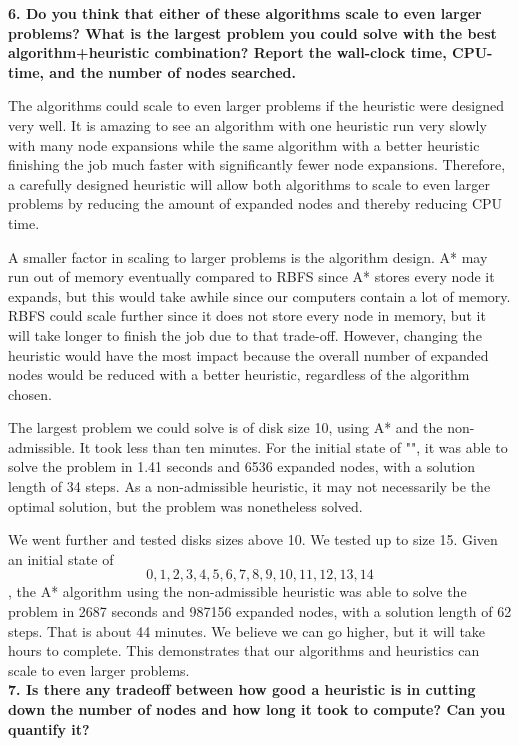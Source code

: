 \textbf{6. Do you think that either of these algorithms scale to even larger problems? What is the largest problem you could solve with the best algorithm+heuristic combination? Report the wall-clock time, CPU-time, and the number of nodes searched.}

The algorithms could scale to even larger problems if the heuristic were designed very well. It is amazing to see an algorithm with one heuristic run very slowly with many node expansions while the same algorithm with a better heuristic finishing the job much faster with significantly fewer node expansions. Therefore, a carefully designed heuristic will allow both algorithms to scale to even larger problems by reducing the amount of expanded nodes and thereby reducing CPU time.

A smaller factor in scaling to larger problems is the algorithm design. A* may run out of memory eventually compared to RBFS since A* stores every node it expands, but this would take awhile since our computers contain a lot of memory. RBFS could scale further since it does not store every node in memory, but it will take longer to finish the job due to that trade-off. However, changing the heuristic would have the most impact because the overall number of expanded nodes would be reduced with a better heuristic, regardless of the algorithm chosen.

The largest problem we could solve is of disk size 10, using A* and the non-admissible. It took less than ten minutes. For the initial state of "", it was able to solve the problem in 1.41 seconds and 6536 expanded nodes, with a solution length of 34 steps. As a non-admissible heuristic, it may not necessarily be the optimal solution, but the problem was nonetheless solved.

We went further and tested disks sizes above 10. We tested up to size 15. Given an initial state of \[0,1,2,3,4,5,6,7,8,9,10,11,12,13,14\], the A* algorithm using the non-admissible heuristic was able to solve the problem in 2687 seconds and 987156 expanded nodes, with a solution length of 62 steps. That is about 44 minutes. We believe we can go higher, but it will take hours to complete. This demonstrates that our algorithms and heuristics can scale to even larger problems.\\

\textbf{7. Is there any tradeoff between how good a heuristic is in cutting down the number of nodes and how long it took to compute? Can you quantify it?}

